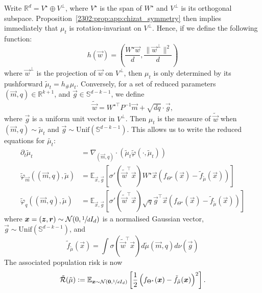 Write $\mathbb R^d = V^\star \oplus V^\bot$, where $V^\star$ is the span of $W^\star$ and $V^\bot$ is its orthogonal subspace. Proposition~\ref{2302:prop:app:chizat_symmetry} then implies immediately that $\mu_t$ is rotation-invariant on $V^\bot$. Hence, if we define the following function:
\begin{equation}
h(\vec{w}) =  \left(\frac{W^\star \vec{w}}d, \frac{\lVert \vec{w}^\bot \rVert^2}d\right)
\end{equation}
where $\vec{w}^\bot$ is the projection of $\vec{w}$ on $V^\bot$, then $\mu_t$ is only determined by its pushforward $\tilde \mu_t = h_\#\mu_t$. 
Conversely, for a set of reduced parameters $(\vec{m}, q)\in\mathbb{R}^{k+1}$, and $\vec{g} \in \mathbb{S}^{d-k-1}$, we define
\begin{equation}
    \tilde{\vec{w}} = W^{\star \top}P^{-1}\vec{m} + \sqrt{d q} \cdot \vec{g},
\end{equation}
where $\vec{g}$ is a uniform unit vector in $V^\bot$. Then $\mu_t$ is the measure of $\tilde{\vec{w}}$ when $(\vec{m}, q) \sim \tilde \mu_t$ and $\vec{g}\sim \mathrm{Unif}(\mathbb{S}^{d-k-1})$. This allows us to write the reduced equations for $\tilde{\mu_t}$:
\begin{equation}
\label{2302:eq:app:df_pde}\tag{DF-PDE}
    \begin{split}
        \partial_t \tilde\mu_t &= \nabla_{(\vec{m}, q)} \cdot \left( \tilde \mu_t \tilde \varphi( \cdot , \tilde \mu_t) \right) \\
        \tilde \varphi_{\vec{m}}((\vec{m}, q), \tilde \mu) &= \mathbb{E}_{\vec{x}, \vec{g}}\left[ \sigma'(\tilde{\vec{w}}^\top \vec{x}) W^\star \vec{x} \left( f_{\Theta^\star}(\vec{x}) - \tilde f_{\tilde \mu}(\vec{x}) \right) \right] \\
        \tilde \varphi_{q}((\vec{m}, q), \tilde \mu) &= \mathbb{E}_{\vec{x}, \vec{g}}\left[ \sigma'(\tilde{\vec{w}}^\top \vec{x}) \sqrt{q} \vec{g}^\top \vec{x} \left( f_{\Theta^\star}(\vec{x}) -\tilde  f_{\tilde \mu}(\vec{x}) \right) \right]
    \end{split}
\end{equation}
where ${\boldsymbol{x}} = ({\boldsymbol{z}}, {\boldsymbol{r}}) \sim \mathcal{N}(0, \sfrac{1}{d}I_d)$ is a normalised Gaussian vector, $\vec{g} \sim \mathrm{Unif}(\mathbb{S}^{d-k-1})$, and
\begin{equation}
    \tilde f_{\tilde \mu}(\vec{x}) = \int \sigma(\tilde{\vec{w}}^\top \vec{x}) d\tilde\mu(\vec{m}, q) d\nu(\vec{g})
\end{equation}
The associated population risk is now
\begin{equation}
    \tilde{\mathcal{R}}(\tilde\mu) :=  \mathbb E_{{\boldsymbol{x}} \sim \mathcal N({\boldsymbol{0}}, \sfrac{1}{d} I_d)} \left[\frac12 \left( f_{\Theta^\star}({\boldsymbol{x}}) - \tilde f_{\tilde\mu}({\boldsymbol{x}}) \right)^2 \right].
\end{equation}


